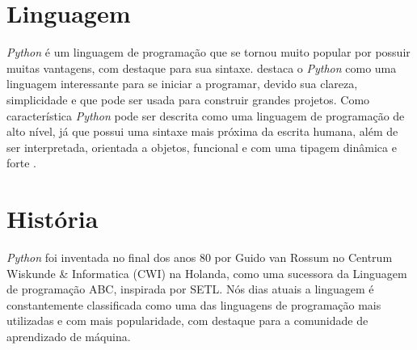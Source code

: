 \section{Linguagem}
\indent \textit{Python} é um linguagem de programação que se tornou muito popular por possuir muitas vantagens, com destaque para sua sintaxe. \cite{menezes2010introduccao} destaca o \textit{Python} como uma linguagem interessante para se iniciar a programar, devido sua clareza, simplicidade e que pode ser usada para construir grandes projetos. Como característica \textit{Python} pode ser descrita como uma linguagem de programação de alto nível, já que possui uma sintaxe mais próxima da escrita humana, além de ser interpretada, orientada a objetos, funcional e com uma tipagem dinâmica e forte \cite{wiki:python}.

\section{História}

\indent \textit{Python} foi inventada no final dos anos 80 por Guido van Rossum no Centrum Wiskunde \& Informatica (CWI) na Holanda, como uma sucessora da Linguagem de programação ABC, inspirada por SETL. Nós dias atuais a linguagem é constantemente classificada como uma das linguagens de programação mais utilizadas e com mais popularidade, com destaque para a comunidade de aprendizado de máquina. \cite{wiki:python}
